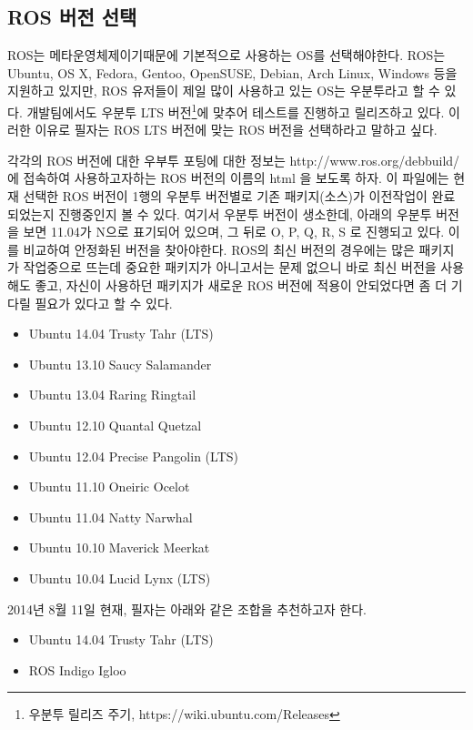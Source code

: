 \subsection{ROS 버전 선택}

ROS는 메타운영체제이기때문에 기본적으로 사용하는 OS를 선택해야한다. ROS는 Ubuntu, OS X, Fedora, Gentoo, OpenSUSE, Debian, Arch Linux, Windows 등을 지원하고 있지만, ROS 유저들이 제일 많이 사용하고 있는 OS는 우분투라고 할 수 있다. 개발팀에서도 우분투 LTS 버전\footnote{우분투 릴리즈 주기, https://wiki.ubuntu.com/Releases}에 맞추어 테스트를 진행하고 릴리즈하고 있다. 이러한 이유로 필자는 ROS LTS 버전에 맞는 ROS 버전을 선택하라고 말하고 싶다. 

각각의 ROS 버전에 대한 우부투 포팅에 대한 정보는 http://www.ros.org/debbuild/ 에 접속하여 사용하고자하는 ROS 버전의 이름의 html 을 보도록 하자. 이 파일에는 현재 선택한 ROS 버전이 1행의 우분투 버전별로 기존 패키지(소스)가 이전작업이 완료되었는지 진행중인지 볼 수 있다. 여기서 우분투 버전이 생소한데, 아래의 우분투 버전을 보면 11.04가 N으로 표기되어 있으며, 그 뒤로 O, P, Q, R, S 로 진행되고 있다. 이를 비교하여 안정화된 버전을 찾아야한다. ROS의 최신 버전의 경우에는 많은 패키지가 작업중으로 뜨는데 중요한 패키지가 아니고서는 문제 없으니 바로 최신 버전을 사용해도 좋고, 자신이 사용하던 패키지가 새로운 ROS 버전에 적용이 안되었다면 좀 더 기다릴 필요가 있다고 할 수 있다. 

\begin{itemize}
\item Ubuntu 14.04 Trusty Tahr (LTS)
\item Ubuntu 13.10 Saucy Salamander
\item Ubuntu 13.04 Raring Ringtail 
\item Ubuntu 12.10 Quantal Quetzal 
\item Ubuntu 12.04 Precise Pangolin (LTS)
\item Ubuntu 11.10 Oneiric Ocelot
\item Ubuntu 11.04 Natty Narwhal
\item Ubuntu 10.10 Maverick Meerkat
\item Ubuntu 10.04 Lucid Lynx (LTS)
\end{itemize}

2014년 8월 11일 현재, 필자는 아래와 같은 조합을 추천하고자 한다.

\begin{itemize}
\item Ubuntu 14.04 Trusty Tahr (LTS)
\item ROS Indigo Igloo
\end{itemize}

